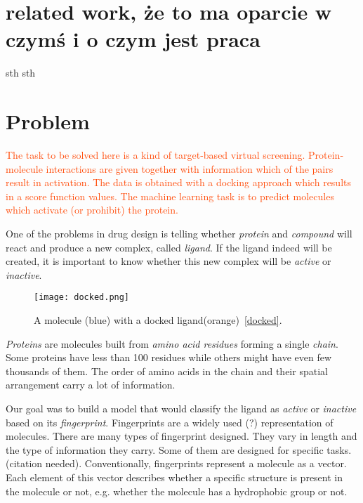 \documentclass[a4paper,10pt]{report}
\newcommand{\igor}[1]{\textcolor{OrangeRed}{#1}}
\begin{document}
    \section{related work, że to ma oparcie w czymś i o czym jest praca}
    sth sth %

    \section{Problem}
    \igor{
    The task to be solved here is a kind of target-based virtual screening. Protein-molecule interactions are given together with information which of the pairs result in activation\todo{przepisać zdanie}. The data is obtained with a docking approach which results in a score function values. The machine learning task is to predict molecules which \todo[inline]{which molecules} activate (or prohibit) the protein.
    }
    
    
    One of the problems in drug design is telling whether \emph{protein} and \emph{compound} will react and produce a new complex, called \emph{ligand}. If the ligand indeed will be created, it is important to know whether this new complex will be \emph{active} or \emph{inactive}. 
    
    \begin{figure}[h!] %
	  \centering
	  \texttt{[image: docked.png]}
	  \caption{A molecule (blue) with a docked ligand(orange)~\ref{docked}.}
	  \label{PIC:docked}
    \end{figure} 
    
    \emph{Proteins} are molecules built from \emph{amino acid residues} forming a single \emph{chain}. Some proteins have less than 100 residues while others might have even few thousands of them. The order of amino acids in the chain and their spatial arrangement carry a lot of information. 
    
    Our goal was to build a model that would classify the ligand as \emph{active} or \emph{inactive} based on its \emph{fingerprint}. Fingerprints are a widely used (?) representation of molecules. There are many types of fingerprint designed. They vary in length and the type of information they carry. Some of them are designed for specific tasks. (citation needed). Conventionally, fingerprints represent a molecule as a vector. Each element of this vector describes whether a specific structure is present in the molecule or not, e.g. whether the molecule has a hydrophobic group or not. 
    
\end{document}
